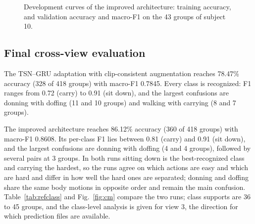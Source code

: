 \documentclass[runningheads]{llncs}
\begin{document}
\begin{figure}[tb]
\centering
{}
\caption{Development curves of the improved architecture: training accuracy, and validation accuracy and macro-F1 on the 43 groups of subject 10.}
\label{fig:curves}
\end{figure}

\subsection{Final cross-view evaluation}
The TSN--GRU adaptation with clip-consistent augmentation reaches 78.47\% accuracy (328 of 418 groups) with macro-F1 0.7845. Every class is recognized: F1 ranges from 0.72 (carry) to 0.91 (sit down), and the largest confusions are donning with doffing (11 and 10 groups) and walking with carrying (8 and 7 groups).

The improved architecture reaches 86.12\% accuracy (360 of 418 groups) with macro-F1 0.8608. Its per-class F1 lies between 0.81 (carry) and 0.91 (sit down), and the largest confusions are donning with doffing (4 and 4 groups), followed by several pairs at 3 groups. In both runs sitting down is the best-recognized class and carrying the hardest, so the runs agree on which actions are easy and which are hard and differ in how well the hard ones are separated; donning and doffing share the same body motions in opposite order and remain the main confusion. Table~\ref{tab:refclass} and Fig.~\ref{fig:cm} compare the two runs; class supports are 36 to 45 groups, and the class-level analysis is given for view 3, the direction for which prediction files are available.
\end{document}
